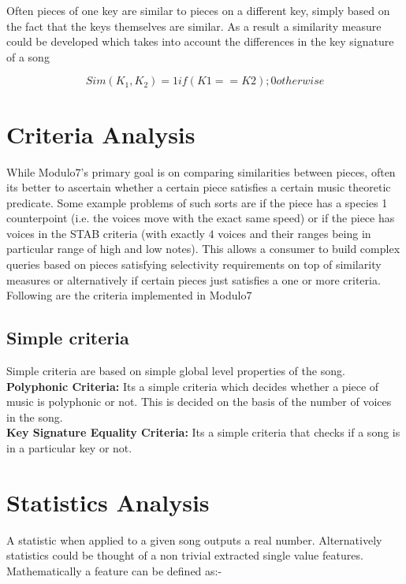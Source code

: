 \noindent Often pieces of one key are similar to pieces on a different key, simply based on the fact that the keys themselves are similar. As a result a similarity measure could be developed which takes into account the differences in the key signature of a song

\begin{equation}
Sim(K_1, K_2) = 1 if (K1 == K2) ; 0 otherwise
\end{equation}


\section{Criteria Analysis} \label{criteria}

\noindent While Modulo7's primary goal is on comparing similarities between pieces, often its better to ascertain whether a certain piece satisfies a certain music theoretic predicate. Some example problems of such sorts are if the piece has a species 1 counterpoint (i.e. the voices move with the exact same speed) or if the piece has voices in the STAB criteria (with exactly 4 voices and their ranges being in particular range of high and low notes). This allows a consumer to build complex queries based on pieces satisfying selectivity requirements on top of similarity measures or alternatively if certain pieces just satisfies a one or more criteria. Following are the criteria implemented in Modulo7

\subsection{Simple criteria} 

\noindent Simple criteria are based on simple global level properties of the song. \\

\noindent \textbf{Polyphonic Criteria:} Its a simple criteria which decides whether a piece of music is polyphonic or not. This is decided on the basis of the number of voices in the song. \\

\noindent \textbf{Key Signature Equality Criteria:} Its a simple criteria that checks if a song is in a particular key or not.

\section{Statistics Analysis} \label{statistic}

\noindent A statistic when applied to a given song outputs a real number. Alternatively statistics could be thought of a non trivial extracted single value features. Mathematically a feature can be defined as:-

